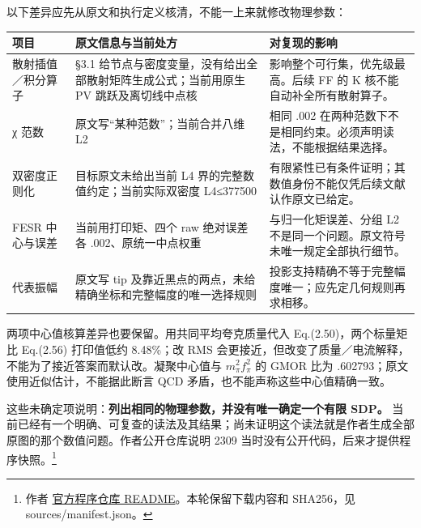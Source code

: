 \documentclass[
  11pt,
  a4paper,
]{article}
\newcounter{none} %
\begin{document}
以下差异应先从原文和执行定义核清，不能一上来就修改物理参数：

{\def\LTcaptype{none} %
\begin{longtable}[]{@{}
  >{\raggedright\arraybackslash}p{}
  >{\raggedright\arraybackslash}p{}
  >{\raggedright\arraybackslash}p{}@{}}
\toprule\noalign{}
\begin{minipage}[b]{\linewidth}\raggedright
项目
\end{minipage} & \begin{minipage}[b]{\linewidth}\raggedright
原文信息与当前处方
\end{minipage} & \begin{minipage}[b]{\linewidth}\raggedright
对复现的影响
\end{minipage} \\
\midrule\noalign{}
\endhead
\bottomrule\noalign{}
\endlastfoot
散射插值／积分算子 & §3.1
给节点与密度变量，没有给出全部散射矩阵生成公式；当前用原生 PV
跳跃及离切线中点核 & 影响整个可行集，优先级最高。后续 FF 的 K
核不能自动补全所有散射算子。 \\
χ 范数 & 原文写``某种范数''；当前合并八维 L2 & 相同 .002
在两种范数下不是相同约束。必须声明读法，不能根据结果选择。 \\
双密度正则化 & 目标原文未给出当前 L4 界的完整数值约定；当前实际双密度
L4≤377500 &
有限紧性已有条件证明；其数值身份不能仅凭后续文献认作原文已给定。 \\
FESR 中心与误差 & 当前用打印矩、四个 raw 绝对误差各 .002、原统一中点权重
& 与归一化矩误差、分组 L2
不是同一个问题。原文符号未唯一规定全部执行细节。 \\
代表振幅 & 原文写 tip
及靠近黑点的两点，未给精确坐标和完整幅度的唯一选择规则 &
投影支持精确不等于完整幅度唯一；应先定几何规则再求相移。 \\
\end{longtable}
}

两项中心值核算差异也要保留。用共同平均夸克质量代入
Eq.(2.50)，两个标量矩比 Eq.(2.56) 打印值低约 8.48\%；改 RMS
会更接近，但改变了质量／电流解释，不能为了接近答案而默认改。凝聚中心值与
\(m_\pi^2f_\pi^2\) 的 GMOR 比为 .602793；原文使用近似估计，不能据此断言
QCD 矛盾，也不能声称这些中心值精确一致。

这些未确定项说明：\textbf{列出相同的物理参数，并没有唯一确定一个有限
SDP。}
当前已经有一个明确、可复查的读法及其结果；尚未证明这个读法就是作者生成全部原图的那个数值问题。作者公开仓库说明
2309 当时没有公开代码，后来才提供程序快照。\footnote{作者
  \href{https://github.com/hyfysics/gauge-theory-bootstrap\#paper-snapshots}{官方程序仓库
  README}。本轮保留下载内容和 SHA256，见 sources/manifest.json。}
\end{document}
